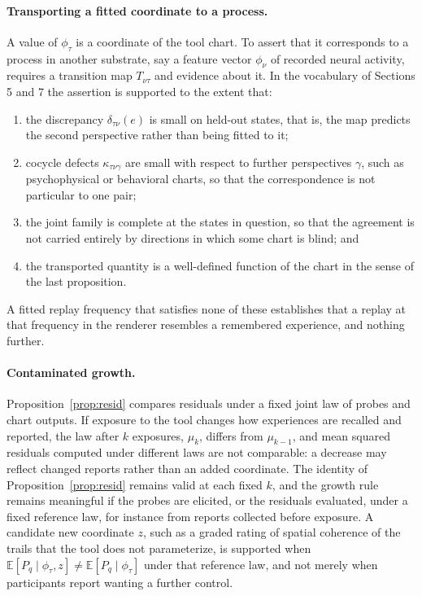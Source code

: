 \documentclass[11pt]{article}
\theoremstyle{remark}
\newcommand{\E}{\mathbb{E}}
\begin{document}
\paragraph{Transporting a fitted coordinate to a process.} A value of $\phi_\tau$ is a coordinate of the tool chart. To assert that it corresponds to a process in another substrate, say a feature vector $\phi_\nu$ of recorded neural activity, requires a transition map $T_{\nu\tau}$ and evidence about it. In the vocabulary of Sections 5 and 7 the assertion is supported to the extent that:
\begin{enumerate}[label=(\roman*),nosep]
\item the discrepancy $\delta_{\tau\nu}(e)$ is small on held-out states, that is, the map predicts the second perspective rather than being fitted to it;
\item cocycle defects $\kappa_{\tau\nu\gamma}$ are small with respect to further perspectives $\gamma$, such as psychophysical or behavioral charts, so that the correspondence is not particular to one pair;
\item the joint family is complete at the states in question, so that the agreement is not carried entirely by directions in which some chart is blind; and
\item the transported quantity is a well-defined function of the chart in the sense of the last proposition.
\end{enumerate}
A fitted replay frequency that satisfies none of these establishes that a replay at that frequency in the renderer resembles a remembered experience, and nothing further.

\paragraph{Contaminated growth.} Proposition~\ref{prop:resid} compares residuals under a fixed joint law of probes and chart outputs. If exposure to the tool changes how experiences are recalled and reported, the law after $k$ exposures, $\mu_k$, differs from $\mu_{k-1}$, and mean squared residuals computed under different laws are not comparable: a decrease may reflect changed reports rather than an added coordinate. The identity of Proposition~\ref{prop:resid} remains valid at each fixed $k$, and the growth rule remains meaningful if the probes are elicited, or the residuals evaluated, under a fixed reference law, for instance from reports collected before exposure. A candidate new coordinate $z$, such as a graded rating of spatial coherence of the trails that the tool does not parameterize, is supported when $\E[P_q\mid\phi_\tau,z]\ne\E[P_q\mid\phi_\tau]$ under that reference law, and not merely when participants report wanting a further control.
\end{document}
